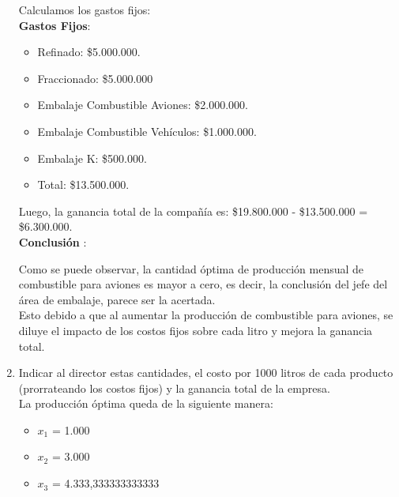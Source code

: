 \documentclass[10pt,a4paper]{article}
\begin{document}
\begin{enumerate}
\begin{itemize}
    \end{itemize}

    Calculamos los gastos fijos:\\

    \textbf{Gastos Fijos}:

    \begin{itemize}

        \item Refinado: \$5.000.000.
        \item Fraccionado: \$5.000.000
        \item Embalaje Combustible Aviones: \$2.000.000.
        \item Embalaje Combustible Vehículos: \$1.000.000.
        \item Embalaje K: \$500.000.
        \item Total: \$13.500.000. \\

    \end{itemize}

    Luego, la ganancia total de la compañía es: \$19.800.000 - \$13.500.000 = \$6.300.000. \\

    \textbf{Conclusión }:

    Como se puede observar, la cantidad óptima de producción mensual de combustible para aviones es mayor a cero, es 
    decir, la conclusión del jefe del área de embalaje, parece ser la acertada. \\
    Esto debido a que al aumentar la producción de combustible para aviones, se diluye el impacto de los costos fijos sobre cada litro y 
    mejora la ganancia total. \\


    \item Indicar al director estas cantidades, el costo por 1000 litros de cada producto (prorrateando los costos fijos)
     y la ganancia total de la empresa. \\

     La producción óptima queda de la siguiente manera:

     \begin{itemize}

        \item $x_{1}$ = 1.000
        \item $x_{2}$ = 3.000
        \item $x_{3}$ = 4.333,333333333333

    \end{itemize}



\end{enumerate}
\end{document}
